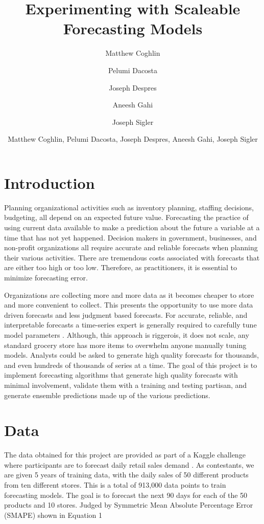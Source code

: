 \documentclass[16pt,twocolumn,letterpaper]{article}
\title{Experimenting with Scaleable Forecasting Models}
\author{
    Matthew Coghlin\\
  	\and
  	Pelumi Dacosta\\
    \and
    Joseph Despres\\
    \and
    Aneesh Gahi\\
    \and
    Joseph Sigler\\
}
\author{ Matthew Coghlin, Pelumi Dacosta, Joseph Despres, Aneesh Gahi, Joseph Sigler}
\begin{document}
\maketitle



\section{Introduction}

Planning organizational activities such as inventory planning, staffing decisions, budgeting, all depend on an expected future value. Forecasting the practice of using current data available to make a prediction about the future a variable at a time that has not yet happened. Decision makers in government, businesses, and non-profit organizations all require accurate and reliable forecasts when planning their various activities. There are tremendous costs associated with forecasts that are either too high or too low. Therefore, as practitioners, it is essential to minimize forecasting error. 

Organizations are collecting more and more data as it becomes cheaper to store and more convenient to collect. This presents the opportunity to use more data driven forecasts and less judgment based forecasts. For accurate, reliable, and interpretable forecasts a time-series expert is generally required to carefully tune model parameters \cite{taylor2018forecasting}. Although, this approach is riggerois, it does not scale, any standard grocery store has more items to overwhelm anyone manually tuning models. Analysts could be asked to generate high quality forecasts for thousands, and even hundreds of thousands of series at a time. The goal of this project is to implement forecasting algorithms that generate high quality forecasts with minimal involvement, validate them with a training and testing partisan, and generate ensemble predictions made up of the various predictions.

\section{Data}

The data obtained for this project are provided as part of a Kaggle challenge where participants are to forecast daily retail sales demand \cite{kaggle}. As contestants, we are given 5 years of training data, with the daily sales of 50 different products from ten different stores. This is a total of 913,000 data points to train forecasting models. The goal is to forecast the next 90 days for each of the 50 products and 10 stores. Judged by Symmetric Mean Absolute Percentage Error (SMAPE) shown in Equation 1
\end{document}
